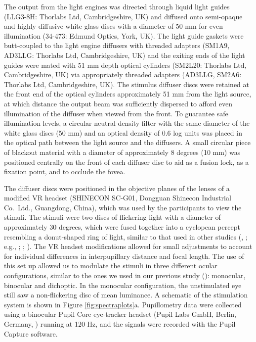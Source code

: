 \documentclass[
]{article}
\begin{document}
The output from the light engines was directed through liquid light guides (LLG3-8H: Thorlabs Ltd, Cambridgeshire, UK) and diffused onto semi-opaque and highly diffusive white glass discs with a diameter of 50 mm for even illumination (34-473: Edmund Optics, York, UK). The light guide gaskets were butt-coupled to the light engine diffusers with threaded adapters (SM1A9, AD3LLG: Thorlabs Ltd, Cambridgeshire, UK) and the exiting ends of the light guides were mated with 51 mm depth optical cylinders (SM2L20: Thorlabs Ltd, Cambridgeshire, UK) via appropriately threaded adapters (AD3LLG, SM2A6: Thorlabs Ltd, Cambridgeshire, UK). The stimulus diffuser discs were retained at the front end of the optical cylinders approximately 51 mm from the light source, at which distance the output beam was sufficiently dispersed to afford even illumination of the diffuser when viewed from the front. To guarantee safe illumination levels, a circular neutral-density filter with the same diameter of the white glass discs (50 mm) and an optical density of 0.6 log units was placed in the optical path between the light source and the diffusers. A small circular piece of blackout material with a diameter of approximately 8 degrees (10 mm) was positioned centrally on the front of each diffuser disc to aid as a fusion lock, as a fixation point, and to occlude the fovea.

The diffuser discs were positioned in the objective planes of the lenses of a modified VR headset (SHINECON SC-G01, Dongguan Shinecon Industrial Co.~Ltd., Guangdong, China), which was used by the participants to view the stimuli. The stimuli were two discs of flickering light with a diameter of approximately 30 degrees, which were fused together into a cyclopean percept resembling a donut-shaped ring of light, similar to that used in other studies (, ; e.g., ; ; ). The VR headset modifications allowed for small adjustments to account for individual differences in interpupillary distance and focal length. The use of this set up allowed us to modulate the stimuli in three different ocular configurations, similar to the ones we used in our previous study (): monocular, binocular and dichoptic. In the monocular configuration, the unstimulated eye still saw a non-flickering disc of mean luminance. A schematic of the stimulation system is shown in Figure \ref{fig:spectraplots}a. Pupillometry data were collected using a binocular Pupil Core eye-tracker headset (Pupil Labs GmbH, Berlin, Germany, ) running at 120 Hz, and the signals were recorded with the Pupil Capture software.
\end{document}
